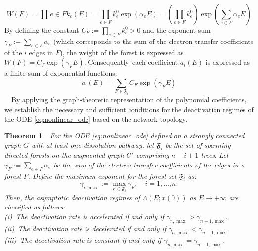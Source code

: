 \documentclass[11pt,a4paper]{article}
\newtheorem{theo}{Theorem}[section]
\begin{document}
\begin{equation}
W(F) = \prod{e \in F} k_e(E) = \prod_{e \in F} k_e^0 \exp(\alpha_e E) = \left(\prod_{e \in F} k_e^0\right) \exp\left(\sum_{e \in F} \alpha_e E\right)
\end{equation}
By defining the constant $C_F := \prod_{e \in F} k_e^0 > 0$ and the exponent sum $\gamma_F := \sum_{e \in F} \alpha_e$ (which corresponds to the sum of the electron transfer coefficients of the $i$ edges in $F$), the weight of the forest is expressed as $W(F) = C_F \exp(\gamma_F E)$. Consequently, each coefficient $a_i(E)$ is expressed as a finite sum of exponential functions:
\begin{equation}
a_i(E) = \sum_{F \in \mathfrak{F}_i} C_F \exp(\gamma_F E) \label{eq:coefficients}
\end{equation}
~~By applying the graph-theoretic representation of the polynomial coefficients, we establish the necessary and sufficient conditions for the deactivation regimes of the ODE \eqref{eq:nonlinear_ode} based on the network topology.
\begin{theo}\label{theo:nonlinear_classification}~For the ODE \eqref{eq:nonlinear_ode} defined on a strongly connected graph $G$ with at least one dissolution pathway, let $\mathfrak{F}_i$ be the set of spanning directed forests on the augmented graph $G'$ comprising $n-i+1$ trees. Let $\gamma_F := \sum_{e \in F} \alpha_e$ be the sum of the electron transfer coefficients of the edges in a forest $F$. Define the maximum exponent for the forest set $\mathfrak{F}_i$ as:
\begin{equation}
\gamma_{i, \max} := \max_{F \in \mathfrak{F}_i} \gamma_F, \quad i=1,\ldots,n.
\end{equation}
Then, the asymptotic deactivation regimes of $\Lambda(E;x(0))$ as $E \to +\infty$ are classified as follows:\\[0.1cm] \noindent
(i)~The deactivation rate is accelerated if and only if $\gamma_{n, \max} > \gamma_{n-1, \max}$.\\[0.1cm] \noindent
(ii)~The deactivation rate is decelerated if and only if $\gamma_{n, \max} < \gamma_{n-1, \max}$.\\[0.1cm] \noindent
(iii)~The deactivation rate is constant if and only if $\gamma_{n, \max} = \gamma_{n-1, \max}$.
\end{theo}
\end{document}
